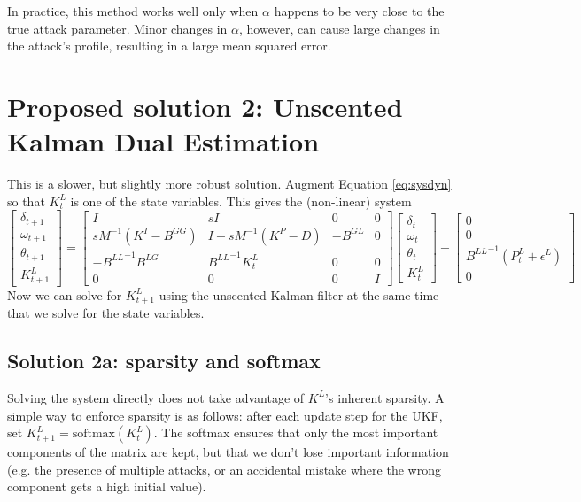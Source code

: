 \documentclass{article}
\begin{document}
In practice, this method works well only when $\alpha$ happens to be very close to the true attack parameter.
Minor changes in $\alpha$, however, can cause large changes in the attack's profile,
resulting in a large mean squared error.

\section*{Proposed solution 2: Unscented Kalman Dual Estimation}

This is a slower, but slightly more robust solution.
Augment Equation \ref{eq:sysdyn} so that $K_t^L$ is one of the state variables.
This gives the (non-linear) system
\begin{equation}
\label{eq:modsysdyn}
\begin{bmatrix}
\delta_{t+1} \\
\omega_{t+1} \\
\theta_{t+1} \\
K^L_{t+1}
\end{bmatrix}
=
\begin{bmatrix}
I & sI & 0 & 0 \\
sM^{-1}(K^I-B^{GG}) & I + sM^{-1}(K^P-D) & -B^{GL} & 0\\
-{B^{LL}}^{-1}B^{LG} & {B^{LL}}^{-1}K^L_t & 0 & 0 \\
0 & 0 & 0 & I
\end{bmatrix}
\begin{bmatrix}
\delta_{t} \\
\omega_{t} \\
\theta_{t} \\
K^L_t
\end{bmatrix}
+
\begin{bmatrix}
0 \\
0 \\
{B^{LL}}^{-1}(P^L_t + \epsilon^L) \\
0
\end{bmatrix}
\end{equation}
Now we can solve for $K^L_{t+1}$ using the unscented Kalman filter at the same time that we solve for the state variables.

\subsection*{Solution 2a: sparsity and softmax}
Solving the system directly does not take advantage of $K^L$'s inherent sparsity.
A simple way to enforce sparsity is as follows:
after each update step for the UKF,
set $K^L_{t+1} = \text{softmax}(K^L_t)$.
The softmax ensures that only the most important components of the matrix are kept, but that we don't lose important information (e.g. the presence of multiple attacks, or an accidental mistake where the wrong component gets a high initial value).
\end{document}
